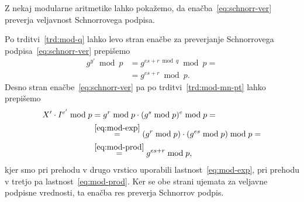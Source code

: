Z nekaj modularne aritmetike lahko pokažemo, da enačba~\eqref{eq:schnorr-ver} preverja veljavnost
Schnorrovega podpisa.

Po trditvi~\ref{trd:mod-q} lahko levo stran enačbe za preverjanje Schnorrovega podpisa~\eqref{eq:schnorr-ver}
prepišemo
\begin{align*}
    g^{y'} \bmod p &= g^{es + r \bmod q} \bmod p = \\ 
                   &= g^{es + r} \bmod p. 
\end{align*}
Desno stran enačbe~\eqref{eq:schnorr-ver} pa po trditvi~\ref{trd:mod-mn-pt} lahko prepišemo
\begin{align*}
X' \cdot I^{e'} \bmod p &= g^r \bmod p \cdot (g^s \bmod p)^e \bmod p = \\
                        &\stackrel{\eqref{eq:mod-exp}}{=} (g^r \bmod p) \cdot (g^{es} \bmod p) \bmod p = \\ 
                        &\stackrel{\eqref{eq:mod-prod}}{=} g^{es + r} \bmod p,
\end{align*}
kjer smo pri prehodu v drugo vrstico uporabili lastnost~\eqref{eq:mod-exp}, pri prehodu v tretjo 
pa lastnost~\eqref{eq:mod-prod}. Ker se obe strani ujemata za veljavne podpisne vrednosti, ta enačba 
res preverja Schnorrov podpis.
